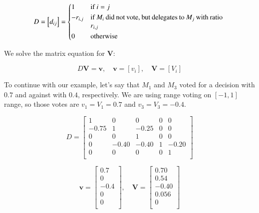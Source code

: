 \documentclass{sigchi}
\begin{document}
\begin{displaymath}
D = \left[d_{ij}\right] = \begin{dcases*}
 1 & if $i = j$ \\
 -r_{i,j} & \parbox[t]{.55\columnwidth}{if $M_i$ did not vote, but delegates to $M_j$ with ratio $r_{i,j}$} \\
 0 & otherwise \\
\end{dcases*}
\end{displaymath}

We solve the matrix equation for $\boldsymbol{V}$:

\begin{displaymath}
D \boldsymbol{V} = \boldsymbol{v},\quad \boldsymbol{v} = \left[v_{i}\right],\quad \boldsymbol{V} = \left[V_{i}\right]
\end{displaymath}

To continue with our example, let's say that $M_1$ and $M_3$ voted for a decision with $0.7$ and against with $0.4$,
respectively.
We are using range voting on $[-1, 1]$ range, so those votes are $v_1 = V_1 = 0.7$ and
$v_3 = V_3 = -0.4$.

\begin{displaymath}
D = \left[ \begin{array}{ccccc}
1 & 0 & 0 & 0 & 0 \\
-0.75 & 1 & -0.25 & 0 & 0 \\
0 & 0 & 1 & 0 & 0 \\
0 & -0.40 & -0.40 & 1 & -0.20 \\
0 & 0 & 0 & 0 & 1 \\
\end{array} \right]
\end{displaymath}

\begin{displaymath}
\boldsymbol{v} = \left[ \begin{array}{c}
0.7 \\
0 \\
-0.4 \\
0 \\
0 \\
\end{array} \right],\quad \boldsymbol{V} = \left[ \begin{array}{c}
0.70 \\
0.54 \\
-0.40 \\
0.056 \\
0 \\
\end{array} \right]
\end{displaymath}
\end{document}
